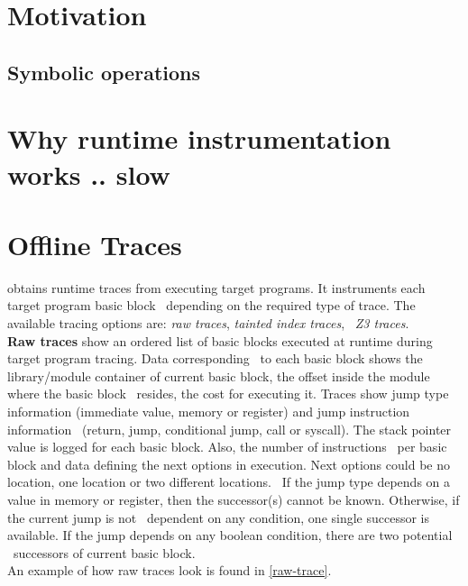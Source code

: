 \documentclass[format=acmsmall]{acmart}
\author{Teodor Stoenescu}
\affiliation{%
  \institution{Bitdefender}
  \city{Bucharest}
  \country{Romania}}
\author{Alexandra Sandulescu}
\affiliation{%
  \institution{Bitdefender}
  \city{Bucharest}
  \country{Romania}}
\title{\mytitle}
\newcommand{\allcaps}[1]{\texorpdfstring{\textsmaller[.5]{#1}}{#1}\xspace}
\newcommand{\river}{\allcaps{RIVER}}
\begin{document}
\begin{abstract}

\end{abstract}

\maketitle
\renewcommand{\shortauthors}{T. Stoenescu, A. Sandulescu}

\section{Motivation}
\subsection{Symbolic operations}\label{subsec:symbolic-operations}

\section{Why runtime instrumentation works .. slow}

\section{\river Offline Traces}
\river obtains runtime traces from executing target programs. It instruments each target program basic block \
depending on the required type of trace. The available tracing options are: \textit{raw traces}, \textit{tainted index traces}, \
\textit{Z3 traces}. \\

\textbf{Raw traces} show an ordered list of basic blocks executed at runtime during target program tracing. Data corresponding \
to each basic block shows the library/module container of current basic block, the offset inside the module where the basic block \
resides, the cost for executing it. Traces show jump type information (immediate value, memory or register) and jump instruction information \
(return, jump, conditional jump, call or syscall). The stack pointer value is logged for each basic block. Also, the number of instructions \
per basic block and data defining the next options in execution. Next options could be no location, one location or two different locations. \
If the jump type depends on a value in memory or register, then the successor(s) cannot be known. Otherwise, if the current jump is not \
dependent on any condition, one single successor is available. If the jump depends on any boolean condition, there are two potential \
successors of current basic block. \\
An example of how raw traces look is found in \autoref{raw-trace}. \\
\end{document}
